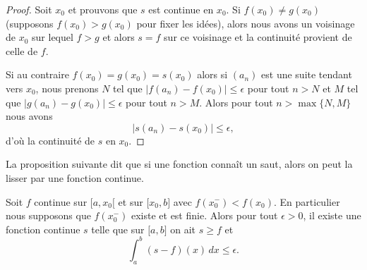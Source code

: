 \begin{proof}
	Soit \( x_0\) et prouvons que \( s\) est continue en \( x_0\). Si \( f(x_0)\neq g(x_0)\) (supposons \( f(x_0)>g(x_0)\) pour fixer les idées), alors nous avons un voisinage de \( x_0\) sur lequel \( f>g\) et alors \( s=f\) sur ce voisinage et la continuité provient de celle de \( f\).

	Si au contraire \( f(x_0)=g(x_0)=s(x_0)\) alors si \( (a_n)\) est une suite tendant vers \( x_0\), nous prenons \( N\) tel que \( \big| f(a_n)-f(x_0) \big|\leq \epsilon\) pour tout \( n>N\) et \( M\) tel que \( \big| g(a_n)-g(x_0) \big|\leq \epsilon\) pour tout \( n> M\). Alors pour tout \( n>\max\{ N,M \}\) nous avons
	\begin{equation}
		\big| s(a_n)-s(x_0) \big|\leq \epsilon,
	\end{equation}
	d'où la continuité de \( s\) en \( x_0\).
\end{proof}

La proposition suivante dit que si une fonction connaît un saut, alors on peut la lisser par une fonction continue.
\begin{proposition} \label{PropTIeYVw}
	Soit \( f\) continue sur \( \mathopen[ a , x_0 [\) et sur \( \mathopen[ x_0 , b \mathclose]\) avec \( f(x_0^-)<f(x_0)\). En particulier nous supposons que \( f(x_0^-)\) existe et est finie. Alors pour tout \( \epsilon>0\), il existe une fonction continue \( s\) telle que sur \( \mathopen[ a , b \mathclose]\) on ait \( s\geq f\) et
	\begin{equation}
		\int_a^b(s-f)(x)\,dx\leq \epsilon.
	\end{equation}
\end{proposition}

